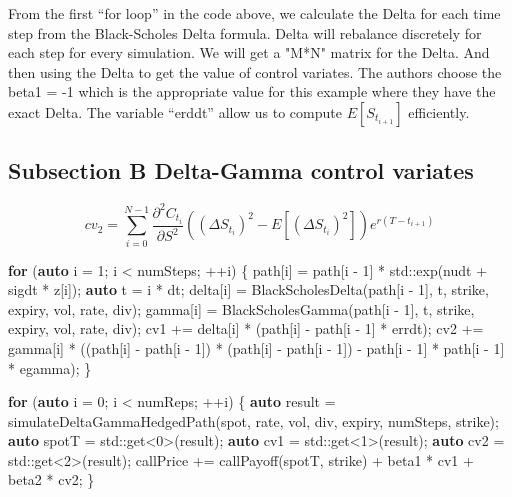 \documentclass[11pt,]{article}
\newenvironment{Shaded}{\begin{snugshade}}{\end{snugshade}}
\newcommand{\BuiltInTok}[1]{#1}
\newcommand{\ControlFlowTok}[1]{\textcolor[rgb]{0.13,0.29,0.53}{\textbf{#1}}}
\newcommand{\DecValTok}[1]{\textcolor[rgb]{0.00,0.00,0.81}{#1}}
\newcommand{\KeywordTok}[1]{\textcolor[rgb]{0.13,0.29,0.53}{\textbf{#1}}}
\newcommand{\NormalTok}[1]{#1}
\begin{document}
From the first ``for loop'' in the code above, we calculate the Delta
for each time step from the Black-Scholes Delta formula. Delta will
rebalance discretely for each step for every simulation. We will get a
"M*N" matrix for the Delta. And then using the Delta to get the value of
control variates. The authors choose the beta1 = -1 which is the
appropriate value for this example where they have the exact Delta. The
variable ``erddt'' allow us to compute \(E[S_{t_{i+1}}]\) efficiently.

\hypertarget{subsection-b-delta-gamma-control-variates}{%
\subsection{Subsection B Delta-Gamma control
variates}\label{subsection-b-delta-gamma-control-variates}}

\[
cv_2 = \sum^{N-1}_{i=0} \frac{\partial^2 C_{t_i}}{\partial S^2}((\Delta S_{t_i})^2 - E[(\Delta S_{t_i})^2])e^{r(T-t_{i+1})}
\]

\begin{Shaded}
\begin{Highlighting}[]
\ControlFlowTok{for}\NormalTok{ (}\KeywordTok{auto}\NormalTok{ i = }\DecValTok{1}\NormalTok{; i < numSteps; ++i)}
\NormalTok{    \{}
\NormalTok{        path[i] = path[i - }\DecValTok{1}\NormalTok{] * }\BuiltInTok{std::}\NormalTok{exp(nudt + sigdt * z[i]);}
        \KeywordTok{auto}\NormalTok{ t = i * dt;}
\NormalTok{        delta[i] = BlackScholesDelta(path[i - }\DecValTok{1}\NormalTok{], t, strike, expiry, vol, rate, div);}
\NormalTok{        gamma[i] = BlackScholesGamma(path[i - }\DecValTok{1}\NormalTok{], t, strike, expiry, vol, rate, div);}
\NormalTok{        cv1 += delta[i] * (path[i] - path[i - }\DecValTok{1}\NormalTok{] * errdt);}
\NormalTok{        cv2 += gamma[i] * ((path[i] - path[i - }\DecValTok{1}\NormalTok{]) * (path[i] - path[i - }\DecValTok{1}\NormalTok{]) - path[i - }\DecValTok{1}\NormalTok{] * path[i - }\DecValTok{1}\NormalTok{] * egamma);}
\NormalTok{    \}}

\ControlFlowTok{for}\NormalTok{ (}\KeywordTok{auto}\NormalTok{ i = }\DecValTok{0}\NormalTok{; i < numReps; ++i)}
\NormalTok{    \{}
        \KeywordTok{auto}\NormalTok{ result = simulateDeltaGammaHedgedPath(spot, rate, vol, div, expiry, numSteps, strike);}
        \KeywordTok{auto}\NormalTok{ spotT = }\BuiltInTok{std::}\NormalTok{get<}\DecValTok{0}\NormalTok{>(result);}
        \KeywordTok{auto}\NormalTok{ cv1 = }\BuiltInTok{std::}\NormalTok{get<}\DecValTok{1}\NormalTok{>(result);}
        \KeywordTok{auto}\NormalTok{ cv2 = }\BuiltInTok{std::}\NormalTok{get<}\DecValTok{2}\NormalTok{>(result);}
\NormalTok{        callPrice += callPayoff(spotT, strike) + beta1 * cv1 + beta2 * cv2;}
\NormalTok{    \}}
\end{Highlighting}
\end{Shaded}
\end{document}
